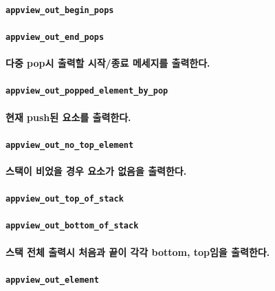 \documentclass[UTF8]{report}
\begin{document}
            \paragraph{\texttt{appview\_out\_begin\_pops}}
            \paragraph{\texttt{appview\_out\_end\_pops}}
            \paragraph{%
                \normalfont 다중 pop시 출력할 시작/종료 메세지를 출력한다.
            }

            \paragraph{\texttt{appview\_out\_popped\_element\_by\_pop}}
            \paragraph{%
                \normalfont 현재 push된 요소를 출력한다.
            }

            \paragraph{\texttt{appview\_out\_no\_top\_element}}
            \paragraph{%
                \normalfont 스택이 비었을 경우 요소가 없음을 출력한다.
            }

            \paragraph{\texttt{appview\_out\_top\_of\_stack}}
            \paragraph{\texttt{appview\_out\_bottom\_of\_stack}}
            \paragraph{%
                \normalfont 스택 전체 출력시 처음과 끝이 각각 bottom, top임을 출력한다.
            }

            \paragraph{\texttt{appview\_out\_element}}
\end{document}
